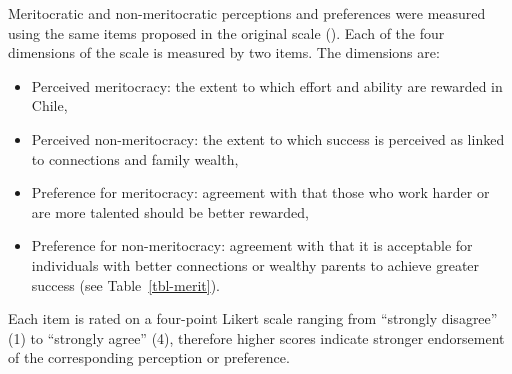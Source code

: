 \documentclass[
  13pt,
]{article}
\begin{document}
Meritocratic and non-meritocratic perceptions and preferences were
measured using the same items proposed in the original scale
().
Each of the four dimensions of the scale is measured by two items. The
dimensions are:

\begin{itemize}
\item
  Perceived meritocracy: the extent to which effort and ability are
  rewarded in Chile,
\item
  Perceived non-meritocracy: the extent to which success is perceived as
  linked to connections and family wealth,
\item
  Preference for meritocracy: agreement with that those who work harder
  or are more talented should be better rewarded,
\item
  Preference for non-meritocracy: agreement with that it is acceptable
  for individuals with better connections or wealthy parents to achieve
  greater success (see Table~\ref{tbl-merit}).
\end{itemize}

Each item is rated on a four-point Likert scale ranging from ``strongly
disagree'' (1) to ``strongly agree'' (4), therefore higher scores
indicate stronger endorsement of the corresponding perception or
preference.
\end{document}
